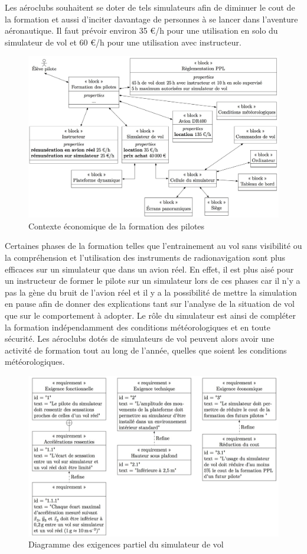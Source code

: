 Les aéroclubs souhaitent se doter de tels simulateurs afin de diminuer le cout de la formation et aussi d'inciter 
davantage de personnes à se lancer dans l'aventure aéronautique. Il faut prévoir environ 35 \euro /h pour une 
utilisation en solo du simulateur de vol et 60 \euro /h pour une utilisation avec instructeur. 

\begin{figure}[!h]
 \centering\includegraphics[width=0.9\linewidth]{img/figure_2}
 \caption{Contexte économique de la formation des pilotes}
 \label{img02}
\end{figure}

Certaines phases de la formation telles que l'entrainement au vol sans visibilité ou la compréhension et l'utilisa­tion des instruments de radionavigation sont plus efficaces sur un simulateur que dans un avion réel. En effet, il est plus aisé pour un instructeur de former le pilote sur un simulateur lors de ces phases car il n'y a pas la gène du bruit de l'avion réel et il y a la possibilité de mettre la simulation en pause afin de donner des explications tant sur l'analyse de la situation de vol que sur le comportement à adopter. 
Le rôle du simulateur est ainsi de compléter la formation indépendamment des conditions météorologiques et en toute sécurité. Les aéroclubs dotés de simulateurs de vol peuvent alors avoir une activité de formation tout au long de l'année, quelles que soient les conditions météorologiques. 

\newpage

\begin{figure}[!h]
 \centering\includegraphics[width=0.9\linewidth]{img/figure_3}
 \caption{Diagramme des exigences partiel du simulateur de vol}
 \label{img03}
\end{figure}

